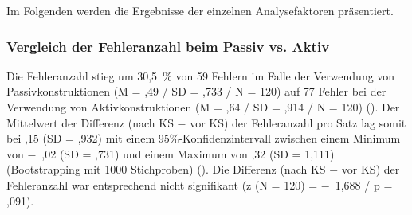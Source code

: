 
Im Folgenden werden die Ergebnisse der einzelnen Analysefaktoren präsentiert.

\subsubsection{Vergleich der Fehleranzahl beim Passiv vs. Aktiv}\label{sec:5.3.6.1}

Die Fehleranzahl stieg um 30,5~\% von 59 Fehlern im Falle der Verwendung von Passivkonstruktionen (M = ,49 / SD = ,733 / N = 120) auf 77 Fehler bei der Verwendung von Aktivkonstruktionen (M = ,64 / SD = ,914 / N = 120) (). Der Mittelwert der Differenz (nach KS $-$ vor KS) der Fehleranzahl pro Satz lag somit bei ,15 (SD = ,932) mit einem 95\%\nobreakdash-Konfidenzintervall zwischen einem Minimum von $-$~,02 (SD = ,731) und einem Maximum von ,32 (SD = 1,111) (Bootstrapping mit 1000 Stichproben) (). Die Differenz (nach KS $-$ vor KS) der Fehleranzahl war entsprechend nicht signifikant (z (N = 120) = $-$~1,688 / p = ,091).


